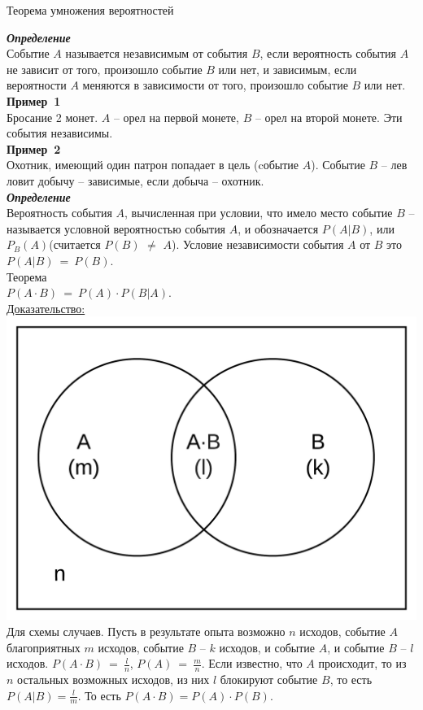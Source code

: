 \documentclass[russian, 12pt, fleqn]{article}
\begin{document}
\begin{center}
$\textbf{Теорема умножения вероятностей }$
\end{center}
\textit{\textbf{Определение}}\\Событие $A$ называется независимым от события $B$, если вероятность события $A$ не зависит от того, произошло событие $B$ или нет, и зависимым, если вероятности $A$ меняются в зависимости от того, произошло событие $B$ или нет.\\
\textbf{Пример\ 1 }\\Бросание 2 монет. $A$ -- орел на первой монете, $B$ -- орел на второй монете. Эти события независимы.\\
\textbf{Пример\ 2 }\\Охотник, имеющий один патрон попадает в цель (cобытие $A$). Событие $B$ -- лев ловит добычу -- зависимые, если добыча -- охотник.\\
\textit{\textbf{Определение}}\\Вероятность события $A$, вычисленная при условии, что имело место событие $B$ -- называется условной вероятностью события $A$, и обозначается $P(A|B)$, или $P_B(A)$(считается $P(B)$ $\neq$ $A$). Условие независимости события $A$ от $B$ это $P(A|B)\ =\ P(B)$.\\
$\textbf{Теорема}$\\ $P(A\cdot B)\ =\ P(A)\cdot P(B|A)$.\\
\underline{Доказательство:}\\
\includegraphics[scale=0.3]{Page9.png}\\
Для схемы случаев. Пусть в результате опыта возможно $n$ исходов, событие $A$ благоприятных $m$ исходов, событие $B$ -- $k$ исходов, и событие $A$, и событие $B$ -- $l$ исходов. $P(A\cdot B)\ =\ \frac{l}{n}$, $P(A)\ =\ \frac{m}{n}$. Если известно, что $A$ происходит, то из $n$ остальных возможных исходов, из них $l$ блокируют событие $B$, то есть  $P(A|B)=\frac{l}{m}$. То есть $P(A\cdot B) = P(A)\cdot P(B)$.\\
\end{document}
